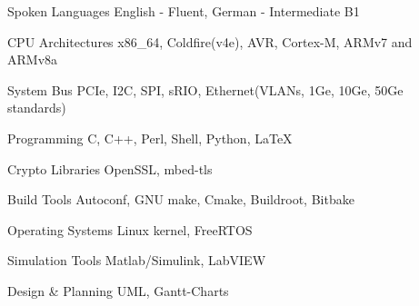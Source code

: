 

\begin{cvskills}

  \cvskill
    {Spoken Languages} %
    {English - Fluent, German - Intermediate B1} %

\cvskill
	{CPU Architectures} %
	{x86\_64, Coldfire(v4e), AVR, Cortex-M, ARMv7 and ARMv8a} %

\cvskill
	{System Bus} %
	{PCIe, I2C, SPI, sRIO, Ethernet(VLANs, 1Ge, 10Ge, 50Ge standards)} %

  \cvskill
    {Programming} %
    {C, C++, Perl, Shell, Python, LaTeX} %

  \cvskill
    {Crypto Libraries} %
    {OpenSSL, mbed-tls} %

  \cvskill
  	{Build Tools} %
  	{Autoconf, GNU make, Cmake, Buildroot, Bitbake} %

  \cvskill
    {Operating Systems} %
    {Linux kernel, FreeRTOS} %

  \cvskill
    {Simulation Tools} %
    {Matlab/Simulink, LabVIEW} %

  \cvskill
    {Design \& Planning} %
    {UML, Gantt-Charts} %

\end{cvskills}
